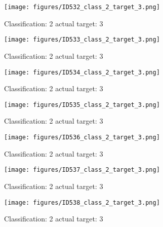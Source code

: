 \begin{figure}[h!]
\begin{center}
\texttt{[image: figures/ID532\_class\_2\_target\_3.png]}
\end{center}
\caption{ Classification: 2 actual target: 3}
\label{fig:ID532_class_2_target_3}
\end{figure}
\begin{figure}[h!]
\begin{center}
\texttt{[image: figures/ID533\_class\_2\_target\_3.png]}
\end{center}
\caption{ Classification: 2 actual target: 3}
\label{fig:ID533_class_2_target_3}
\end{figure}
\begin{figure}[h!]
\begin{center}
\texttt{[image: figures/ID534\_class\_2\_target\_3.png]}
\end{center}
\caption{ Classification: 2 actual target: 3}
\label{fig:ID534_class_2_target_3}
\end{figure}
\begin{figure}[h!]
\begin{center}
\texttt{[image: figures/ID535\_class\_2\_target\_3.png]}
\end{center}
\caption{ Classification: 2 actual target: 3}
\label{fig:ID535_class_2_target_3}
\end{figure}
\begin{figure}[h!]
\begin{center}
\texttt{[image: figures/ID536\_class\_2\_target\_3.png]}
\end{center}
\caption{ Classification: 2 actual target: 3}
\label{fig:ID536_class_2_target_3}
\end{figure}
\begin{figure}[h!]
\begin{center}
\texttt{[image: figures/ID537\_class\_2\_target\_3.png]}
\end{center}
\caption{ Classification: 2 actual target: 3}
\label{fig:ID537_class_2_target_3}
\end{figure}
\begin{figure}[h!]
\begin{center}
\texttt{[image: figures/ID538\_class\_2\_target\_3.png]}
\end{center}
\caption{ Classification: 2 actual target: 3}
\label{fig:ID538_class_2_target_3}
\end{figure}
